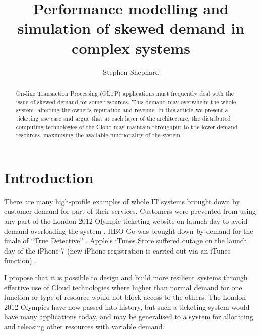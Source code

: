 \documentclass{llncs}
\begin{document}
\title{Performance modelling and simulation of skewed demand in complex systems}

\author{Stephen Shephard}


\maketitle

%
%

\begin{abstract}
On-line Transaction Processing (OLTP) applications must frequently deal with the issue of skewed demand for some resources.  This demand may overwhelm the whole system, affecting the owner's reputation and revenue.  In this article we present a ticketing use case and argue that at each layer of the architecture, the distributed computing technologies of the Cloud may maintain throughput to the lower demand resources, maximising the available functionality of the system.  
\end{abstract}

%
%

\section{Introduction}

There are many high-profile examples of whole IT systems brought down by customer demand for part of their services.  Customers were prevented from using any part of the London 2012 Olympic ticketing website on launch day to avoid demand overloading the system \cite{telegraph2011olympics}.  HBO Go was brought down by demand for the finale of ``True Detective'' \cite{hbo2014}.  Apple's iTunes Store suffered outage on the launch day of the iPhone 7 (new iPhone registration is carried out via an iTunes function) \cite{itunes2016}.

I propose that it is possible to design and build more resilient systems through effective use of Cloud technologies where higher than normal demand for one function or type of resource would not block access to the others. The London 2012 Olympics have now passed into history, but such a ticketing system would have many applications today, and may be generalised to a system for allocating and releasing other resources with variable demand.
\end{document}
